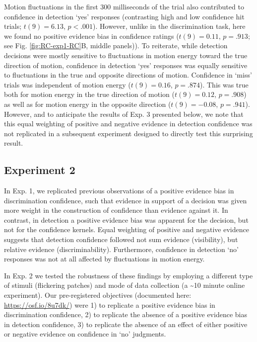 \documentclass[
  english,
  man]{apa6}
\begin{document}
Motion fluctuations in the first 300 milliseconds of the trial also contributed to confidence in detection `yes' responses (contrasting high and low confidence hit trials; \(t(9) = 6.13\), \(p < .001\)). However, unlike in the discrimination task, here we found no positive evidence bias in confidence ratings (\(t(9) = 0.11\), \(p = .913\); see Fig. \ref{fig:RC-exp1-RC}B, middle panels)). To reiterate, while detection decisions were mostly sensitive to fluctuations in motion energy toward the true direction of motion, confidence in detection `yes' responses was equally sensitive to fluctuations in the true and opposite directions of motion.
Confidence in `miss' trials was independent of motion energy (\(t(9) = 0.16\), \(p = .874\)). This was true both for motion energy in the true direction of motion (\(t(9) = 0.12\), \(p = .908\)) as well as for motion energy in the opposite direction (\(t(9) = -0.08\), \(p = .941\)). However, and to anticipate the results of Exp. 3 presented below, we note that this equal weighting of positive and negative evidence in detection confidence was not replicated in a subsequent experiment designed to directly test this surprising result.

\hypertarget{experiment-2}{%
\subsection{Experiment 2}\label{experiment-2}}

In Exp. 1, we replicated previous observations of a positive evidence bias in discrimination confidence, such that evidence in support of a decision was given more weight in the construction of confidence than evidence against it. In contrast, in detection a positive evidence bias was apparent for the decision, but not for the confidence kernels. Equal weighting of positive and negative evidence suggests that detection confidence followed not sum evidence (visibility), but relative evidence (discriminability). Furthermore, confidence in detection `no' responses was not at all affected by fluctuations in motion energy.

In Exp. 2 we tested the robustness of these findings by employing a different type of stimuli (flickering patches) and mode of data collection (a \textasciitilde10 minute online experiment). Our pre-registered objectives (documented here: \url{https://osf.io/8u7dk/}) were 1) to replicate a positive evidence bias in discrimination confidence, 2) to replicate the absence of a positive evidence bias in detection confidence, 3) to replicate the absence of an effect of either positive or negative evidence on confidence in `no' judgments.
\end{document}
